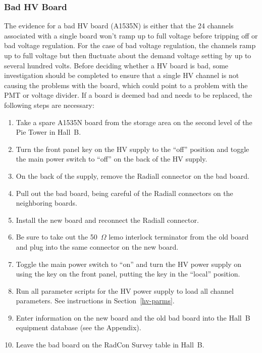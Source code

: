 \documentclass[12pt]{article}
\begin{document}
\subsubsection{Bad HV Board}
\label{board-swap}

The evidence for a bad HV board (A1535N) is either that the 24 channels associated with a single 
board won't ramp up to full voltage before tripping off or bad voltage regulation. For the case
of bad voltage regulation, the channels ramp up to full voltage but then fluctuate about the demand 
voltage setting by up to several hundred volts. Before deciding whether a HV board is bad, some
investigation should be completed to ensure that a single HV channel is not causing the problems
with the board, which could point to a problem with the PMT or voltage divider. If a board is deemed 
bad and needs to be replaced, the following steps are necessary:

\begin{enumerate}
\item Take a spare A1535N board from the storage area on the second level of the Pie Tower in Hall~B.
\item Turn the front panel key on the HV supply to the ``off'' position and toggle the main power 
switch to ``off'' on the back of the HV supply.
\item On the back of the supply, remove the Radiall connector on the bad board.
\item Pull out the bad board, being careful of the Radiall connectors on the neighboring boards.
\item Install the new board and reconnect the Radiall connector.
\item Be sure to take out the 50~$\Omega$ lemo interlock terminator from the old board and plug into
the same connector on the new board.
\item Toggle the main power switch to ``on'' and turn the HV power supply on using the key on the 
front panel, putting the key in the ``local'' position.
\item Run all parameter scripts for the HV power supply to load all channel parameters. See 
instructions in Section~\ref{hv-parms}.
\item Enter information on the new board and the old bad board into the Hall~B equipment database 
(see the Appendix).
\item Leave the bad board on the RadCon Survey table in Hall~B.
\end{enumerate}
\end{document}
